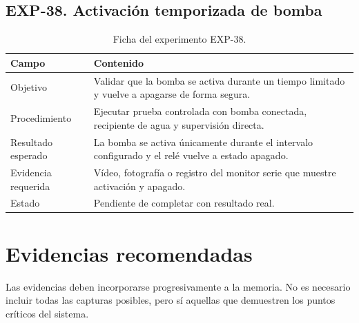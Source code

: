\subsection{EXP-38. Activación temporizada de bomba}

\begin{table}[H]
\centering
\renewcommand{\arraystretch}{1.25}
\small
\begin{tabular}{|p{}|p{}|}
\hline
\rowcolor{gray!20}
\textbf{Campo} & \textbf{Contenido} \\
\hline
Objetivo & Validar que la bomba se activa durante un tiempo limitado y vuelve a apagarse de forma segura. \\
\hline
Procedimiento & Ejecutar prueba controlada con bomba conectada, recipiente de agua y supervisión directa. \\
\hline
Resultado esperado & La bomba se activa únicamente durante el intervalo configurado y el relé vuelve a estado apagado. \\
\hline
Evidencia requerida & Vídeo, fotografía o registro del monitor serie que muestre activación y apagado. \\
\hline
Estado & Pendiente de completar con resultado real. \\
\hline
\end{tabular}
\caption{Ficha del experimento EXP-38.}
\label{tab:ficha_exp_38}
\end{table}

\section{Evidencias recomendadas}

Las evidencias deben incorporarse progresivamente a la memoria. No es necesario incluir todas las capturas posibles, pero sí aquellas que demuestren los puntos críticos del sistema.

